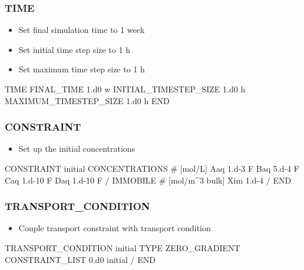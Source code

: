 \documentclass{beamer}
\newcommand\bluecomment[1]{{{\color{blue} #1}}}
\begin{document}
\begin{frame}[fragile]\frametitle{TIME}

\begin{itemize}
\item Set final simulation time to 1 week
\item Set initial time step size to 1 h
\item Set maximum time step size to 1 h
\end{itemize}


\begin{semiverbatim}


TIME
  FINAL_TIME 1.d0 w
  INITIAL_TIMESTEP_SIZE 1.d0 h
  MAXIMUM_TIMESTEP_SIZE 1.d0 h
END
\end{semiverbatim}

\end{frame}

\begin{frame}[fragile]\frametitle{CONSTRAINT}

\begin{itemize}
  \item Set up the initial concentrations
\end{itemize}

\begin{semiverbatim}

CONSTRAINT initial
  CONCENTRATIONS \bluecomment{# [mol/L]}
    Aaq  1.d-3   F
    Baq  5.d-4   F
    Caq  1.d-10  F
    Daq  1.d-10  F
  /
  IMMOBILE     \bluecomment{# [mol/m^3 bulk]}
    Xim  1.d-4
  /
END

\end{semiverbatim}

\end{frame}

\begin{frame}[fragile]\frametitle{TRANSPORT\_CONDITION}


\begin{itemize}
  \item Couple transport constraint with transport condition
\end{itemize}
\begin{semiverbatim}

TRANSPORT_CONDITION initial
  TYPE ZERO_GRADIENT
  CONSTRAINT_LIST
    0.d0 initial
  /
END

\end{semiverbatim}

\end{frame}
\end{document}
